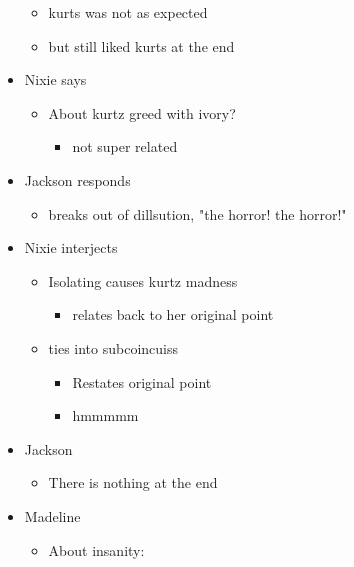 \documentclass[letterpaper]{article}
\begin{document}
\begin{itemize}
\begin{itemize}
\item kurts was not as expected
\item but still liked kurts at the end
\end{itemize}

\item Nixie says

\begin{itemize}
\item About kurtz greed with ivory?

\begin{itemize}
\item not super related
\end{itemize}
\end{itemize}

\item Jackson responds

\begin{itemize}
\item breaks out of dillsution, "the horror! the horror!"
\end{itemize}

\item Nixie interjects

\begin{itemize}
\item Isolating causes kurtz madness

\begin{itemize}
\item relates back to her original point
\end{itemize}

\item ties into subcoincuiss

\begin{itemize}
\item Restates original point
\item hmmmmm
\end{itemize}
\end{itemize}

\item Jackson

\begin{itemize}
\item There is nothing at the end
\end{itemize}

\item Madeline

\begin{itemize}
\item About insanity:


\end{itemize}
\end{itemize}
\end{document}

